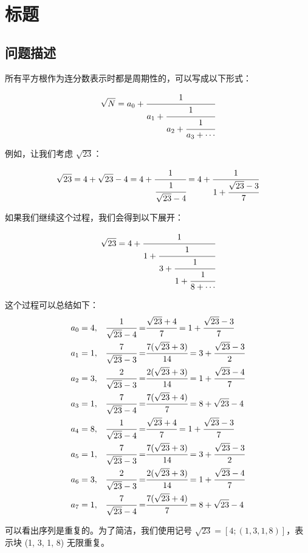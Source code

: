 \section{标题}
\subsection{问题描述}
\begin{tcolorbox}[breakable]
	所有平方根作为连分数表示时都是周期性的，可以写成以下形式：

	\[ \sqrt{N} = a_0 + \cfrac{1}{a_1 + \cfrac{1}{a_2 + \cfrac{1}{a_3 + \cdots}}} \]

	例如，让我们考虑 $\sqrt{23}$：

	\[ \sqrt{23} = 4 + \sqrt{23} - 4 = 4 + \cfrac{1}{\cfrac{1}{\sqrt{23} - 4}} = 4 + \cfrac{1}{1 + \cfrac{\sqrt{23} - 3}{7}} \]

	如果我们继续这个过程，我们会得到以下展开：

	\[ \sqrt{23} = 4 + \cfrac{1}{1 + \cfrac{1}{3 + \cfrac{1}{1 + \cfrac{1}{8 + \cdots}}}} \]

	这个过程可以总结如下：
	\begin{align*}
		a_0 & = 4, & \cfrac{1}{\sqrt{23} - 4}  = & \cfrac{\sqrt{23} + 4}{7}      = 1 + \cfrac{\sqrt{23} - 3}{7} \\
		a_1 & = 1, & \cfrac{7}{\sqrt{23} - 3}  = & \cfrac{7(\sqrt{23} + 3)}{14}  = 3 + \cfrac{\sqrt{23} - 3}{2} \\
		a_2 & = 3, & \cfrac{2}{\sqrt{23} - 3}  = & \cfrac{2(\sqrt{23} + 3)}{14}  = 1 + \cfrac{\sqrt{23} - 4}{7} \\
		a_3 & = 1, & \cfrac{7}{\sqrt{23} - 4}  = & \cfrac{7(\sqrt{23} + 4)}{7}   = 8 + \sqrt{23} - 4            \\
		a_4 & = 8, & \cfrac{1}{\sqrt{23} - 4}  = & \cfrac{\sqrt{23} + 4}{7} = 1 + \cfrac{\sqrt{23} - 3}{7}      \\
		a_5 & = 1, & \cfrac{7}{\sqrt{23} - 3}  = & \cfrac{7(\sqrt{23} + 3)}{14} = 3 + \cfrac{\sqrt{23} - 3}{2}  \\
		a_6 & = 3, & \cfrac{2}{\sqrt{23} - 3}  = & \cfrac{2(\sqrt{23} + 3)}{14} = 1 + \cfrac{\sqrt{23} - 4}{7}  \\
		a_7 & = 1, & \cfrac{7}{\sqrt{23} - 4}  = & \cfrac{7(\sqrt{23} + 4)}{7} = 8 + \sqrt{23} - 4              \\
	\end{align*}

	可以看出序列是重复的。为了简洁，我们使用记号 $\sqrt{23} = [4; (1, 3, 1, 8)]$，表示块 (1, 3, 1, 8) 无限重复。


\end{tcolorbox}
